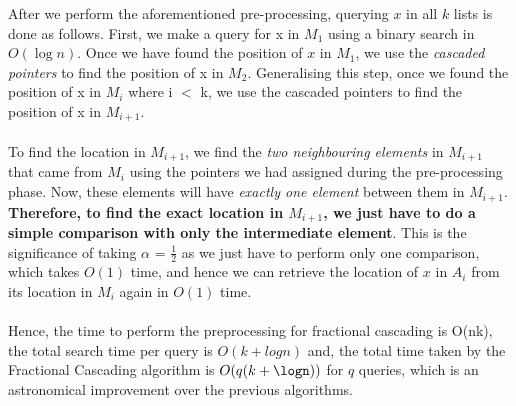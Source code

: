 \documentclass[11pt]{article}
\begin{document}
After we perform the aforementioned pre-processing, querying $x$ in all $k$ lists is done as follows.
First, we make a query for x in $M_1$ using a binary search in $O(\log n)$. Once we have found the position of $x$ in $M_1$, we use the \textit{cascaded pointers} to find the position of x in $M_2$. Generalising this step, once we found the position of x in $M_i$ where i $<$ k, we use the cascaded pointers to find the position of x in $M_{i+1}$. \\ \\
To find the location in $M_{i+1}$, we find the \textit{two neighbouring elements} in $M_{i+1}$ that came from $M_i$ using the pointers we had assigned during the pre-processing phase. Now, these elements will have \textit{exactly one element} between them in $M_{i+1}$. \textbf{Therefore, to find the exact location in $M_{i+1}$, we just have to do a simple comparison with only the intermediate element}. This is the significance of taking $\alpha$ = $\frac{1}{2}$ as we just have to perform only one comparison, which takes $O(1)$ time, and hence we can retrieve the location of $x$ in $A_i$ from its location in $M_i$ again in $O(1)$ time. \\ \\

Hence, the time to perform the preprocessing for fractional cascading is O(nk), the total search time per query is $O(k+log n)$ and, the total time taken by the Fractional Cascading algorithm is $O(q(k+\logn))$ for $q$ queries, which is an astronomical improvement over the previous algorithms.



\end{document}
